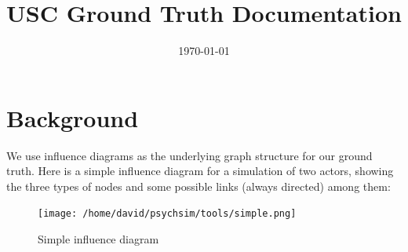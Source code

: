 \documentclass{article}%
\title{USC Ground Truth Documentation}%
\date{\today}%
\begin{document}
%
\normalsize%
\maketitle%
\clearpage%
\tableofcontents%
\clearpage%
\section{Background}%
\label{sec:Background}%
We use influence diagrams as the underlying graph structure for our ground truth. Here is a simple influence diagram for a simulation of two actors, showing the three types of nodes and some possible links (always directed) among them:%


\begin{figure}[ht]%
\centering%
\texttt{[image: /home/david/psychsim/tools/simple.png]}%
\caption{Simple influence diagram}%
\end{figure}
\end{document}
